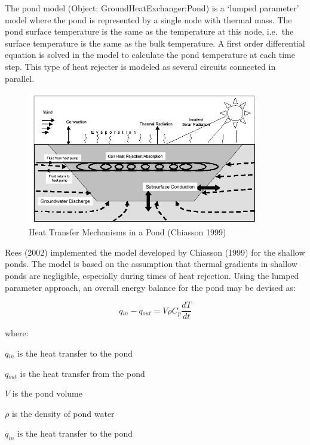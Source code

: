 The pond model (Object: GroundHeatExchanger:Pond) is a `lumped parameter' model where the pond is represented by a single node with thermal mass. The pond surface temperature is the same as the temperature at this node, i.e.~the surface temperature is the same as the bulk temperature. A first order differential equation is solved in the model to calculate the pond temperature at each time step. This type of heat rejecter is modeled as several circuits connected in parallel.

\begin{figure}[hbtp] %
\centering
\includegraphics[width=0.9\textwidth, height=0.9\textheight, keepaspectratio=true]{media/image5676.png}
\caption{Heat Transfer Mechanisms in a Pond (Chiasson 1999) \protect \label{fig:heat-transfer-mechanisms-in-a-pond-chiasson}}
\end{figure}

Rees (2002) implemented the model developed by Chiasson (1999) for the shallow ponds. The model is based on the assumption that thermal gradients in shallow ponds are negligible, especially during times of heat rejection. Using the lumped parameter approach, an overall energy balance for the pond may be devised as:

\begin{equation}
q{}_{in} - q{}_{out} = V\rho C{}_p\frac{{dT}}{{dt}}
\end{equation}

where:

\(q{}_{in}\) is the heat transfer to the pond

\(q{}_{out}\) is the heat transfer from the pond

\(V\) is the pond volume

\(\rho\) is the density of pond water

\({q_{in}}\) is the heat transfer to the pond

